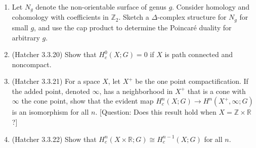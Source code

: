 \documentclass[11pt]{article}
\begin{document}
\begin{enumerate}
\begin{enumerate}
    \end{enumerate}
    \item Let $N_g$ denote the non-orientable surface of genus $g$. Consider homology and cohomology with coefficients in $\mathbb{Z}_2$. Sketch a $\Delta$-complex structure for $N_g$ for small $g$, and use the cap product to determine the Poincar\'e duality for arbitrary $g$.
    \item (Hatcher 3.3.20) Show that $H^0_c(X;G)=0$ if $X$ is path connected and noncompact.
    \item (Hatcher 3.3.21) For a space $X$, let $X^+$ be the one point compactification. If the added point, denoted $\infty$, has a neighborhood in $X^+$ that is a cone with $\infty$ the cone point, show that the evident map $H^n_c(X;G)\to H^n(X^+,\infty;G)$ is an isomorphism for all $n$. [Question: Does this result hold when $X = \mathbb{Z}\times \mathbb{R}$?]
    \item (Hatcher 3.3.22) Show that $H^n_c(X\times\mathbb{R};G)\cong H^{n-1}_c(X;G)$ for all $n$.
\end{enumerate}
\end{document}
